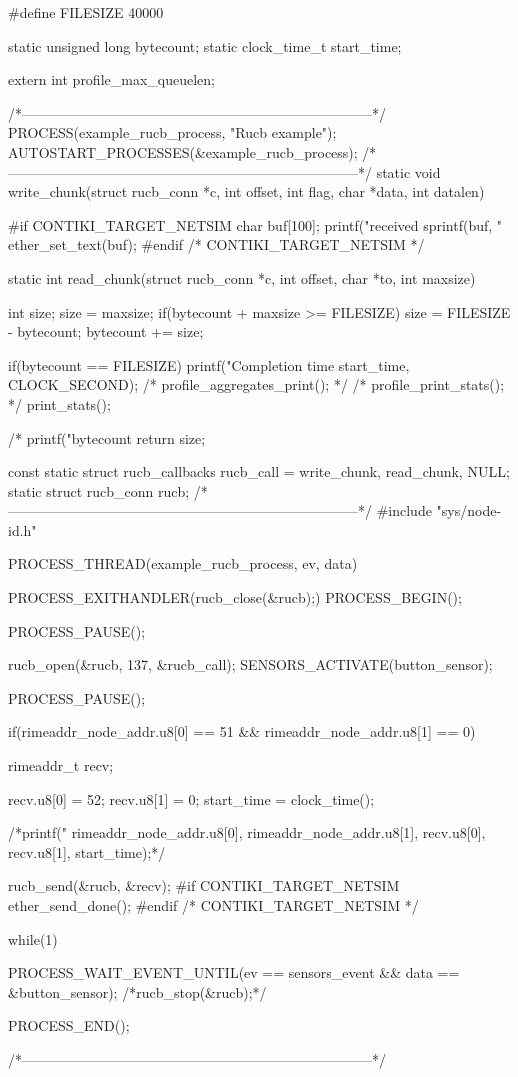 \begin{DoxyCodeInclude}
#define FILESIZE 40000

static unsigned long bytecount;
static clock_time_t start_time;

extern int profile_max_queuelen;

/*---------------------------------------------------------------------------*/
PROCESS(example_rucb_process, "Rucb example");
AUTOSTART_PROCESSES(&example_rucb_process);
/*---------------------------------------------------------------------------*/
static void
write_chunk(struct rucb_conn *c, int offset, int flag,
            char *data, int datalen)
{
#if CONTIKI_TARGET_NETSIM
  {
    char buf[100];
    printf("received %
    sprintf(buf, "%
    ether_set_text(buf);
  }
#endif /* CONTIKI_TARGET_NETSIM */

}
static int
read_chunk(struct rucb_conn *c, int offset, char *to, int maxsize)
{
  int size;
  size = maxsize;
  if(bytecount + maxsize >= FILESIZE) {
    size = FILESIZE - bytecount;
  }
  bytecount += size;

  if(bytecount == FILESIZE) {
    printf("Completion time %
      start_time, CLOCK_SECOND);
    /*     profile_aggregates_print(); */
/*     profile_print_stats(); */
    print_stats();
  }

  /*  printf("bytecount %
  return size;
}
const static struct rucb_callbacks rucb_call = {write_chunk, read_chunk,
                                                NULL};
static struct rucb_conn rucb;
/*---------------------------------------------------------------------------*/
#include "sys/node-id.h"

PROCESS_THREAD(example_rucb_process, ev, data)
{
  PROCESS_EXITHANDLER(rucb_close(&rucb);)
  PROCESS_BEGIN();

  PROCESS_PAUSE();

  
  rucb_open(&rucb, 137, &rucb_call);
  SENSORS_ACTIVATE(button_sensor);

  PROCESS_PAUSE();

  if(rimeaddr_node_addr.u8[0] == 51 &&
      rimeaddr_node_addr.u8[1] == 0) {
    rimeaddr_t recv;

    recv.u8[0] = 52;
    recv.u8[1] = 0;
    start_time = clock_time();

    /*printf("%
        rimeaddr_node_addr.u8[0],
        rimeaddr_node_addr.u8[1],
        recv.u8[0],
        recv.u8[1],
        start_time);*/

    rucb_send(&rucb, &recv);
#if CONTIKI_TARGET_NETSIM
    ether_send_done();
#endif /* CONTIKI_TARGET_NETSIM */
  }

  while(1) {

    PROCESS_WAIT_EVENT_UNTIL(ev == sensors_event &&
                             data == &button_sensor);
    /*rucb_stop(&rucb);*/

  }
  PROCESS_END();
}
/*---------------------------------------------------------------------------*/
\end{DoxyCodeInclude}
 